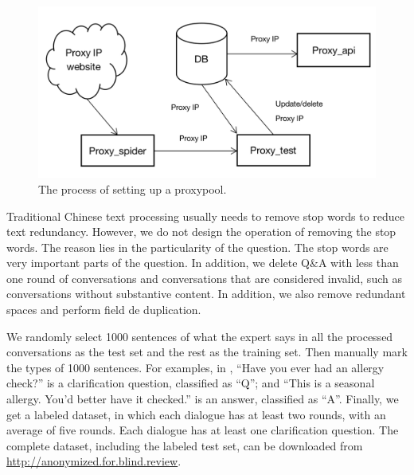 \begin{figure}[th]
\centering
\includegraphics[scale=0.35]{1.png}
\caption{The process of setting up a proxypool.}
\label{fig:figure2}
\end{figure}

Traditional Chinese text processing usually needs to remove stop words to reduce text redundancy. However, we do not design the operation of removing the stop words. The reason lies in the particularity of the question. The stop words are very important parts of the question. In addition, we delete Q$\&$A with less than one round of conversations and conversations that are considered invalid, such as conversations without substantive content. In addition, we also remove redundant spaces and perform field de duplication.

We randomly select 1000 sentences of what the expert says in all the processed conversations as the test set and the rest as the training set. Then manually mark the types of 1000 sentences. For examples, in , ``Have you ever had an allergy check?'' is a clarification question, classified as ``Q''; and ``This is a seasonal allergy. You'd better have it checked.'' is an answer, classified as ``A''. Finally, we get a labeled dataset, in which each dialogue has at least two rounds, with an average of five rounds. Each dialogue has at least one clarification question.
The complete dataset, including the labeled test set, can be downloaded from \url{http://anonymized.for.blind.review}.

